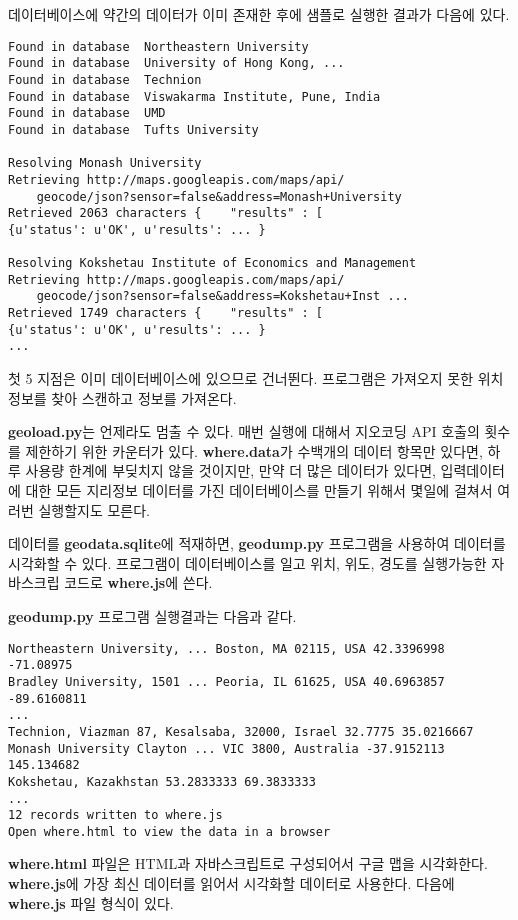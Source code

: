 데이터베이스에 약간의 데이터가 이미 존재한 후에 샘플로 실행한 결과가 다음에 있다.

\beforeverb
\begin{verbatim}
Found in database  Northeastern University
Found in database  University of Hong Kong, ...
Found in database  Technion
Found in database  Viswakarma Institute, Pune, India
Found in database  UMD
Found in database  Tufts University

Resolving Monash University
Retrieving http://maps.googleapis.com/maps/api/
    geocode/json?sensor=false&address=Monash+University
Retrieved 2063 characters {    "results" : [  
{u'status': u'OK', u'results': ... }

Resolving Kokshetau Institute of Economics and Management
Retrieving http://maps.googleapis.com/maps/api/
    geocode/json?sensor=false&address=Kokshetau+Inst ...
Retrieved 1749 characters {    "results" : [  
{u'status': u'OK', u'results': ... }
...
\end{verbatim}
\afterverb
%

첫 5 지점은 이미 데이터베이스에 있으므로 건너뛴다. 프로그램은 가져오지 못한 위치 정보를 찾아 스캔하고
정보를 가져온다.

{\bf geoload.py}는 언제라도 멈출 수 있다. 매번 실행에 대해서
지오코딩 API 호출의 횟수를 제한하기 위한 카운터가 있다.
{\bf where.data}가 수백개의 데이터 항목만 있다면, 하루 사용량 한계에 부딪치지 않을 것이지만,
만약 더 많은 데이터가 있다면, 입력데이터에 대한 모든 지리정보 데이터를 가진 데이터베이스를 만들기 위해서 
몇일에 걸쳐서 여러번 실행할지도 모른다.

데이터를 {\bf geodata.sqlite}에 적재하면, {\bf geodump.py} 프로그램을 사용하여 데이터를 시각화할 수 있다.
프로그램이 데이터베이스를 일고 위치, 위도, 경도를 실행가능한 자바스크립 코드로 {\bf where.js}에 쓴다.

{\bf geodump.py} 프로그램 실행결과는 다음과 같다.

\beforeverb
\begin{verbatim}
Northeastern University, ... Boston, MA 02115, USA 42.3396998 -71.08975
Bradley University, 1501 ... Peoria, IL 61625, USA 40.6963857 -89.6160811
...
Technion, Viazman 87, Kesalsaba, 32000, Israel 32.7775 35.0216667
Monash University Clayton ... VIC 3800, Australia -37.9152113 145.134682
Kokshetau, Kazakhstan 53.2833333 69.3833333
...
12 records written to where.js
Open where.html to view the data in a browser
\end{verbatim}
\afterverb
%

{\bf where.html} 파일은 HTML과 자바스크립트로 구성되어서 구글 맵을 시각화한다.
{\bf where.js}에 가장 최신 데이터를 읽어서 시각화할 데이터로 사용한다.
다음에 {\bf where.js} 파일 형식이 있다.

